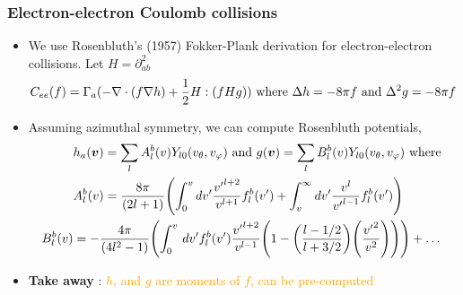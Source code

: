 \documentclass[mathserif, aspectratio=169]{beamer}
\newcommand{\vect}[1]{\boldsymbol{#1}}
\newcommand{\of}[1]{\mleft( #1 \mright)}
\newcommand{\diff}[1]{\, d#1}
\newcommand{\vtheta}{{v_{\theta}}}
\newcommand{\vphi}{v_{\varphi}}
\begin{document}
\begin{frame}
	\frametitle{Electron-electron  Coulomb collisions}
	\begin{itemize}
		\item We use Rosenbluth's (1957) Fokker-Plank derivation for electron-electron collisions. Let $H=\partial^2_{ab}$
		\begin{align}
			C_{ee}(f) &= \Gamma_a(-\nabla \cdot (f \nabla h ) + \frac{1}{2} H : \of{f H g}) \text{ where } \Delta h  = -8\pi f \text{ and } \Delta^2 g =-8\pi f	
		\end{align}
		\item Assuming azimuthal symmetry, we can compute Rosenbluth potentials, 
		\begin{align}
			& h_a\of{\vect{v}} = \sum_{l} A^{b}_l\of{v} Y_{l0}\of{\vtheta, \vphi}  \text{ and } g\of{\vect{v}} = \sum_{l} B^{b}_l\of{v} Y_{l0}\of{\vtheta, \vphi}\text{ where } \\
			\tiny
			& A^{b}_l\of{v} = \frac{8\pi}{(2l+1)}\of{\int_{0}^{v} dv^\prime \frac{{v^\prime}^{l+2}}{v^{l+1}} f^{b}_l\of{v^\prime} +  \int_{v}^{\infty} dv^\prime \frac{{v}^{l}}{{v^\prime}^{l-1}} f^{b}_l\of{v^\prime}}\\
			\tiny
			B^{b}_{l}\of{v} & = -\frac{4\pi}{(4l^2-1)} \of
			{
				\int_{0}^{v} \diff{v^\prime} f^{b}_l\of{v^\prime} \frac{{v^\prime}^{l+2}}{v^{l-1}} \of{1 - \of{\frac{l-1/2}{l+3/2}}\of{\frac{{v^\prime}^2 }{v^2}}} } + \hdots%
		\end{align}
		\item \textbf{Take away} : \textcolor{orange}{$h$, and $g$ are moments of $f$, can be pre-computed}
	\end{itemize}
\end{frame}
\end{document}

